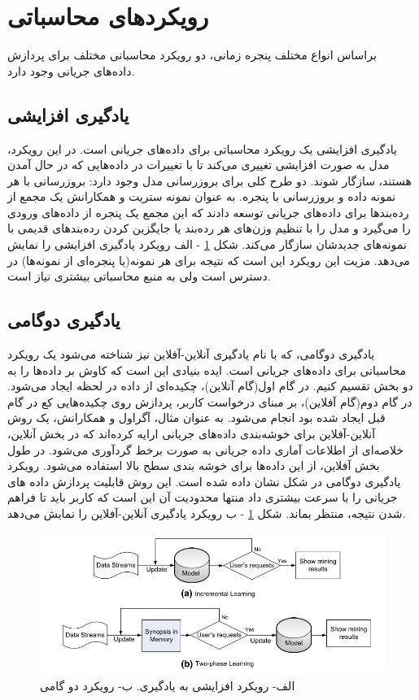 \section{رویکردهای محاسباتی}

براساس انواع مختلف پنجره زمانی، دو رویکرد محاسبانی مختلف برای پردازش داده‌های جریانی وجود دارد.

\subsection{یادگیری افزایشی}
یادگیری افزایشی یک رویکرد محاسباتی برای داده‌های جریانی است. در این رویکرد، مدل به صورت افزایشی تغییری می‌کند تا با تغییرات در داده‌هایی که در حال آمدن هستند، سازگار شوند. دو طرح کلی برای بروزرسانی مدل وجود دارد: بروزرسانی با هر نمونه داده و بروزرسانی با پنجره. به عنوان نمونه ستریت
و همکارانش یک مجمع از رده‌بندها برای داده‌های جریانی توسعه‌ دادند که این مجمع یک پنجره از داده‌های ورودی را می‌گیرد و مدل را با تنظیم وزن‌های هر رده‌بند یا جایگزین کردن رده‌بند‌های قدیمی با نمونه‌های جدیدشان سازگار می‌کند. شکل
\ref{fig:approach}
- الف رویکرد یادگیری افزایشی را نمایش می‌دهد. مزیت این رویکرد این است که نتیجه برای هر نمونه(یا پنجره‌ای از نمونه‌ها) در دسترس است ولی به منبع محاسباتی بیشتری نیاز است.
\subsection{یادگیری دوگامی}
یادگیری دوگامی، که با نام یادگیری آنلاین-آفلاین نیز شناخته می‌شود یک رویکرد محاسباتی برای داده‌های جریانی است. ایده‌ بنیادی این است که کاوش بر داده‌ها را به دو بخش تقسیم کنیم. در گام اول(گام آنلاین)، چکیده‌ای از داده در لحظه ایجاد می‌شود. در گام دوم(گام آفلاین)، بر مبنای درخواست کاربر، پردازش روی چکیده‌هایی کع در گام قبل ایجاد شده بود انجام می‌شود.
به عنوان مثال، آگراول
 و همکارانش، یک روش آنلاین-آفلاین برای خوشه‌بندی داده‌های جریانی ارایه کرده‌اند که در بخش آنلاین، خلاصه‌ای از اطلاعات آماری داده جریانی به صورت برخط گردآوری می‌شود. در طول بخش آفلاین، از این داده‌ها برای خوشه بندی سطح بالا استفاده می‌شود. رویکرد یادگیری دوگامی در شکل نشان داده شده است. این روش قابلیت پردازش داده های جریانی را با سرعت بیشتری داد منتها محدودیت آن این است که کاربر باید تا فراهم شدن نتیجه، منتظر بماند.
شکل
\ref{fig:approach}
- ب رویکرد یادگیری آنلاین-آفلاین را نمایش می‌دهد.




\begin{figure}%
\centerline{\includegraphics[width=15cm]{approach}}
\caption{الف- رویکرد افزایشی به یادگیری. ب- رویکرد دو گامی}
\label{fig:approach}
\end{figure}


